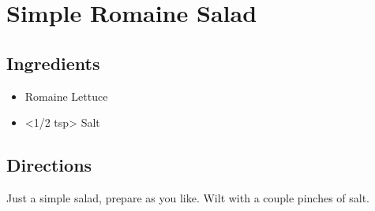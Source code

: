 \section{Simple Romaine Salad}

\subsection{ Ingredients }

\begin{itemize}
  \item <16 oz> Romaine Lettuce
  \item <1/2 tsp> Salt
\end{itemize}

\subsection{ Directions }

Just a simple salad, prepare as you like. Wilt with a couple pinches of salt. 

